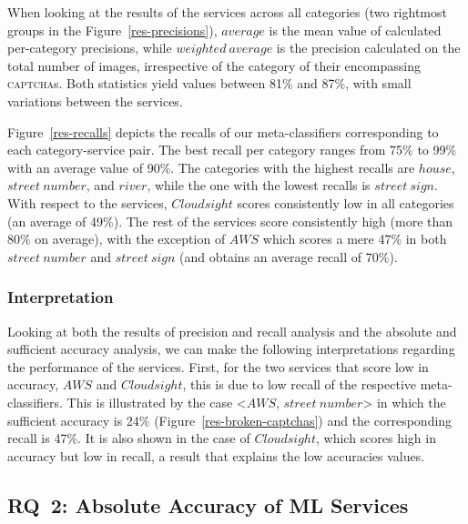 \documentclass[sigconf,review,anonymous]{acmart}
\newcommand{\captchas}{\textsc{captcha}s\xspace}
\begin{document}
When looking at the results of the services across all categories (two rightmost groups in the Figure~\ref{res-precisions}), $average$ is the mean value of calculated per-category precisions, while $weighted~average$ is the precision calculated on the total number of images, irrespective of the category of their encompassing \captchas.  Both statistics yield values between 81\% and 87\%, with small variations between the services.

Figure~\ref{res-recalls} depicts the recalls of our meta-classifiers corresponding to each category-service pair. 
The best recall per category ranges from 75\% to 99\% with an average value of 90\%. The categories with the highest recalls are $house$, $street~number$, and $river$, while the one with the lowest recalls is $street~sign$.
With respect to the services, $Cloudsight$ scores consistently low in all categories (an average of 49\%). The rest of the services score consistently high (more than 80\% on average), with the exception of $AWS$ which scores a mere 47\% in both $street~number$ and $street~sign$ (and obtains an average recall of 70\%).

\subsubsection*{Interpretation}
Looking at both the results of precision and recall analysis and the absolute and sufficient accuracy analysis, we can make the following interpretations regarding the performance of the services. 
First, for the two services that score low in accuracy, $AWS$ and $Cloudsight$, this is due to low recall of the respective meta-classifiers. 
This is illustrated by the case <$AWS$, $street~number$> in which the sufficient accuracy is 24\% (Figure~\ref{res-broken-captchas}) and the corresponding recall is 47\%.
It is also shown in the case of $Cloudsight$, which scores high in accuracy but low in recall, a result that explains the low accuracies values.







\subsection{RQ~2: Absolute Accuracy of ML Services}
\end{document}

